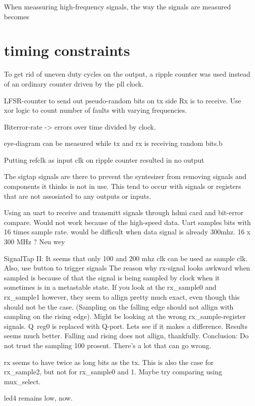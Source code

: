 \documentclass[main.tex]{subfiles}
\begin{document}
When meassuring high-frequency signals, the way the signals are measured becomes 


\section{timing constraints}

To get rid of uneven duty cycles on the output, a ripple counter was used instead of an ordinary counter driven by the pll clock.

LFSR-counter to send out pseudo-random bits on tx side
Rx is to receive. Use xor logic to count number of faults with varying frequencies.

Biterror-rate -> errors over time divided by clock.

eye-diagram can be measured while tx and rx is receiving random bits.b

Putting refclk as input clk on ripple counter resulted in no output

The sigtap signals are there to prevent the syntesizer from removing signals and components it thinks is not in use. This tend to occur with signals or registers that are not assosiated to any outputs or inputs.

Using an uart to receive and transmitt signals through hdmi card and bit-error compare. Would not work because of the high-speed data. Uart samples bits with 16 times sample rate. would be difficult when data signal is already 300mhz. 16 x 300 MHz ? Neu wey

SignalTap II:
It seems that only 100 and 200 mhz clk can be used as sample clk. Also, use button to trigger signals
The reason why rx-signal looks awkward when sampled is because of that the signal is being sampled by clock when it sometimes is in a metastable state. If you look at the rx\_sample0 and rx\_sample1 however, they seem to allign pretty much exact, even though this should not be the case. (Sampling on the falling edge should not allign with sampling on the rising edge). Might be looking at the wrong rx\_sample-register signals. Q~reg0 is replaced with Q-port. Lets see if it makes a difference. Results seems much better. Falling and rising does not allign, thankfully. Conclusion: Do not trust the sampling 100 prosent. There's a lot that can go wrong.

rx seems to have twice as long bits as the tx. This is also the case for rx\_sample2, but not for rx_sample0 and 1. Maybe try comparing using mux_select.

led4 remains low, now. 
\end{document}
